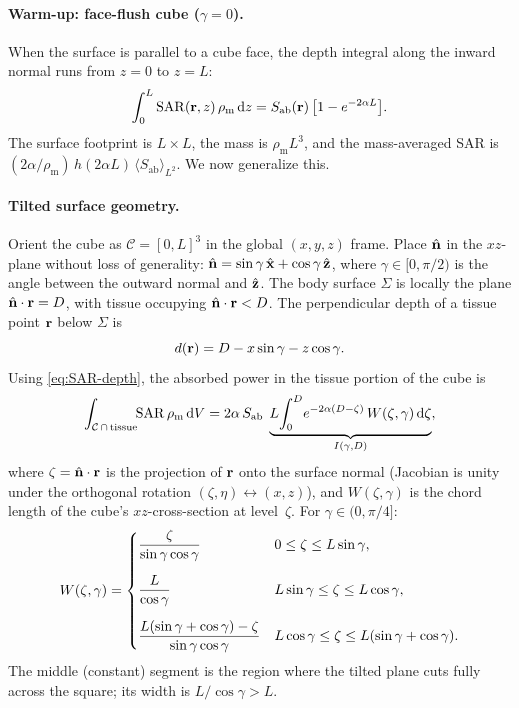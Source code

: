 \documentclass[11pt,a4paper]{article}
\theoremstyle{definition}
\theoremstyle{remark}
\newcommand{\Sab}{S_{\mathrm{ab}}}
\newcommand{\nhat}{\hat{\vb{n}}}
\newcommand{\SAR}{\ensuremath{\mathrm{SAR}}}
\newcommand{\rhom}{\rho_{\mathrm{m}}}
\begin{document}
\paragraph{Warm-up: face-flush cube ($\gamma = 0$).}
When the surface is parallel to a cube face, the depth integral along the
inward normal runs from $z = 0$ to $z = L$:
\begin{equation}\label{eq:cube-depth}
  \int_0^{L} \SAR(\vb{r},z)\,\rhom\,\mathrm{d}z
  = \Sab(\vb{r})\,\bigl[1 - e^{-2\alpha L}\bigr].
\end{equation}
The surface footprint is $L \times L$, the mass is $\rhom L^3$, and the
mass-averaged SAR is $(2\alpha/\rhom)\,h(2\alpha L)\,\langle\Sab\rangle_{L^2}$.
We now generalize this.

\paragraph{Tilted surface geometry.}
Orient the cube as $\mathcal{C} = [0,L]^3$ in the global $(x,y,z)$ frame.
Place $\nhat$ in the $xz$-plane without loss of generality:
$\nhat = \sin\gamma\,\hat{\vb{x}} + \cos\gamma\,\hat{\vb{z}}$,
where $\gamma \in [0, \pi/2)$ is the angle between the outward normal and
$\hat{\vb{z}}$.  The body surface $\Sigma$ is locally the plane
$\nhat \cdot \vb{r} = D$, with tissue occupying $\nhat \cdot \vb{r} < D$.
The perpendicular depth of a tissue point $\vb{r}$ below $\Sigma$ is
\begin{equation}\label{eq:depth-tilted}
  d(\vb{r}) = D - x\sin\gamma - z\cos\gamma.
\end{equation}
Using \cref{eq:SAR-depth}, the absorbed power in the tissue portion of the cube
is
\begin{equation}\label{eq:cube-3d-integral}
  \int_{\mathcal{C}\,\cap\,\text{tissue}}\!\!\SAR\,\rhom\,\mathrm{d}V
  = 2\alpha\,\Sab\;\underbrace{%
    L\!\int_0^{D}\!e^{-2\alpha(D-\zeta)}\,W(\zeta,\gamma)\,\mathrm{d}\zeta
  }_{I(\gamma,D)},
\end{equation}
where $\zeta = \nhat \cdot \vb{r}$ is the projection of $\vb{r}$ onto the
surface normal (Jacobian is unity under the orthogonal rotation
$(\zeta,\eta) \leftrightarrow (x,z)$), and $W(\zeta,\gamma)$ is the chord
length of the cube's $xz$-cross-section at level~$\zeta$.  For
$\gamma \in (0, \pi/4]$:
\begin{equation}\label{eq:W-piecewise}
  W(\zeta,\gamma) =
  \begin{dcases}
    \dfrac{\zeta}{\sin\gamma\cos\gamma}
      & 0 \le \zeta \le L\sin\gamma, \\[6pt]
    \dfrac{L}{\cos\gamma}
      & L\sin\gamma \le \zeta \le L\cos\gamma, \\[6pt]
    \dfrac{L(\sin\gamma + \cos\gamma) - \zeta}{\sin\gamma\cos\gamma}
      & L\cos\gamma \le \zeta \le L(\sin\gamma + \cos\gamma).
  \end{dcases}
\end{equation}
The middle (constant) segment is the region where the tilted plane cuts fully
across the square; its width is $L/\cos\gamma > L$.
\end{document}
